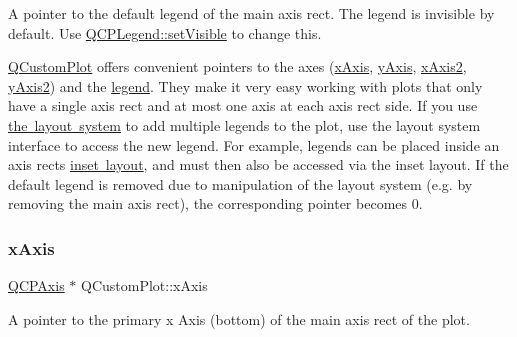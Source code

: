 A pointer to the default legend of the main axis rect. The legend is invisible by default. Use \mbox{\hyperlink{class_q_c_p_layerable_a3bed99ddc396b48ce3ebfdc0418744f8}{Q\+C\+P\+Legend\+::set\+Visible}} to change this.

\mbox{\hyperlink{class_q_custom_plot}{Q\+Custom\+Plot}} offers convenient pointers to the axes (\mbox{\hyperlink{class_q_custom_plot_a9a79cd0158a4c7f30cbc702f0fd800e4}{x\+Axis}}, \mbox{\hyperlink{class_q_custom_plot_af6fea5679725b152c14facd920b19367}{y\+Axis}}, \mbox{\hyperlink{class_q_custom_plot_ada41599f22cad901c030f3dcbdd82fd9}{x\+Axis2}}, \mbox{\hyperlink{class_q_custom_plot_af13fdc5bce7d0fabd640f13ba805c0b7}{y\+Axis2}}) and the \mbox{\hyperlink{class_q_custom_plot_a4eadcd237dc6a09938b68b16877fa6af}{legend}}. They make it very easy working with plots that only have a single axis rect and at most one axis at each axis rect side. If you use \mbox{\hyperlink{}{the layout system}} to add multiple legends to the plot, use the layout system interface to access the new legend. For example, legends can be placed inside an axis rect\textquotesingle{}s \mbox{\hyperlink{class_q_c_p_axis_rect_a949f803466619924c7018df4b511ae10}{inset layout}}, and must then also be accessed via the inset layout. If the default legend is removed due to manipulation of the layout system (e.\+g. by removing the main axis rect), the corresponding pointer becomes 0. \mbox{\label{class_q_custom_plot_a9a79cd0158a4c7f30cbc702f0fd800e4}} 
\subsubsection{\texorpdfstring{x\+Axis}{xAxis}}
{\footnotesize\ttfamily \mbox{\hyperlink{class_q_c_p_axis}{Q\+C\+P\+Axis}} $\ast$ Q\+Custom\+Plot\+::x\+Axis}

A pointer to the primary x Axis (bottom) of the main axis rect of the plot.

